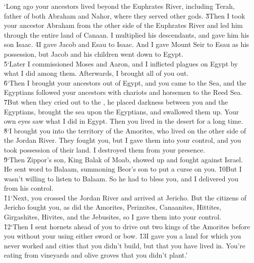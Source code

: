 \begin{poetry}
\poeml `Long ago your ancestors lived beyond the Euphrates River, including Terah, father of both Abraham and Nahor, where they served other gods. \v{3}Then I took your ancestor Abraham from the other side of the Euphrates River and led him through the entire land of Canaan. I multiplied his descendants, and gave him his son Isaac. \v{4}I gave Jacob and Esau to Isaac. And I gave Mount Seir to Esau as his possession, but Jacob and his children went down to Egypt. \\
\poeml \v{5}`Later I commissioned Moses and Aaron, and I inflicted plagues on Egypt by what I did among them. Afterwards, I brought all of you out. \\
\poeml \v{6}`Then I brought your ancestors out of Egypt, and you came to the Sea, and the Egyptians followed your ancestors with chariots and horsemen to the Reed Sea. \v{7}But when they cried out to the , he placed darkness between you and the Egyptians, brought the sea upon the Egyptians, and swallowed them up. Your own eyes saw what I did in Egypt. Then you lived in the desert for a long time. \\
\poeml \v{8}`I brought you into the territory of the Amorites, who lived on the other side of the Jordan River. They fought you, but I gave them into your control, and you took possession of their land. I destroyed them from your presence. \\
\poeml \v{9}`Then Zippor's son, King Balak of Moab, showed up and fought against Israel. He sent word to Balaam, summoning Beor's son to put a curse on you. \v{10}But I wasn't willing to listen to Balaam. So he had to bless you, and I delivered you from his control. \\
\poeml \v{11}`Next, you crossed the Jordan River and arrived at Jericho. But the citizens of Jericho fought you, as did the Amorites, Perizzites, Canaanites, Hittites, Girgashites, Hivites, and the Jebusites, so I gave them into your control. \\
\poeml \v{12}`Then I sent hornets ahead of you to drive out two kings of the Amorites before you without your using either sword or bow. \v{13}I gave you a land for which you never worked and cities that you didn't build, but that you have lived in. You're eating from vineyards and olive groves that you didn't plant.'
\end{poetry}

